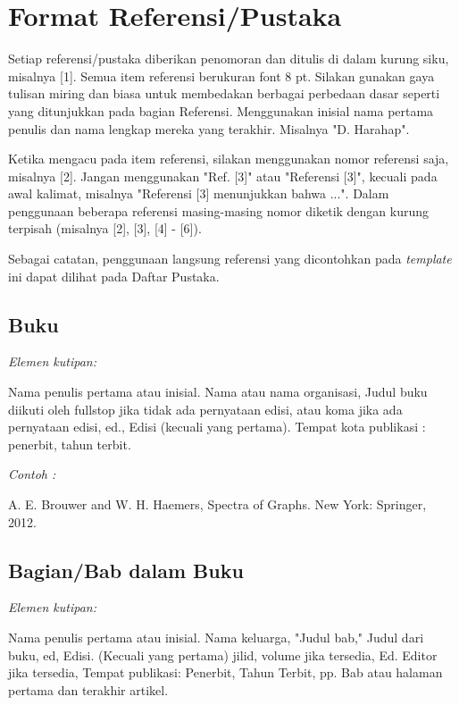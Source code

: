 \documentclass[conference, a4paper]{IEEEtran_ID}
\begin{document}
\section{Format Referensi/Pustaka}

	Setiap referensi/pustaka diberikan penomoran dan ditulis di dalam kurung siku, misalnya [1]. Semua item referensi berukuran font 8 pt. Silakan gunakan gaya tulisan miring dan biasa untuk membedakan berbagai perbedaan dasar seperti yang ditunjukkan pada bagian Referensi. Menggunakan inisial nama pertama penulis dan nama lengkap mereka yang terakhir. Misalnya "D. Harahap".

	Ketika mengacu pada item referensi, silakan menggunakan nomor referensi saja, misalnya [2]. Jangan menggunakan "Ref. [3]" atau "Referensi [3]", kecuali pada awal kalimat, misalnya "Referensi [3] menunjukkan bahwa ...". Dalam penggunaan beberapa referensi masing-masing nomor diketik dengan kurung terpisah (misalnya [2], [3], [4] - [6]).

	Sebagai catatan, penggunaan langsung referensi yang dicontohkan pada \textit{template} ini dapat dilihat pada Daftar Pustaka. \cite{pustaka1,pustaka2,pustaka3,pustaka4,pustaka5}

\subsection{Buku}

	\textit{Elemen kutipan:}

	Nama penulis pertama atau inisial. Nama atau nama organisasi, Judul buku diikuti oleh fullstop jika tidak ada pernyataan edisi, atau koma jika ada pernyataan edisi, ed., Edisi (kecuali yang pertama). Tempat kota publikasi : penerbit, tahun terbit.

	\textit{Contoh \cite{pustaka1}:}

	A. E. Brouwer and W. H. Haemers, Spectra of Graphs. New York: Springer, 2012.

\subsection{Bagian/Bab dalam Buku}

	\textit{Elemen kutipan:}

	Nama penulis pertama atau inisial. Nama keluarga, "Judul bab," Judul dari buku, ed, Edisi. (Kecuali yang pertama)  jilid, volume jika tersedia, Ed. Editor jika tersedia, Tempat publikasi: Penerbit, Tahun Terbit, pp. Bab atau halaman pertama dan terakhir artikel.
\end{document}
